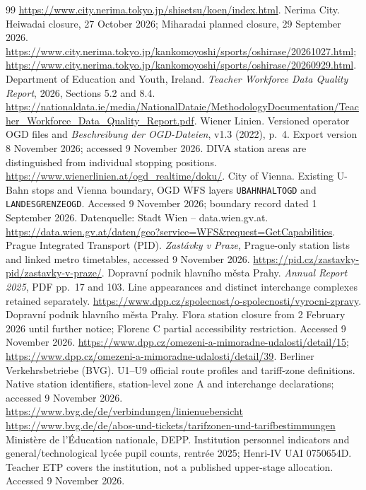 \begin{thebibliography}{99}
\url{https://www.city.nerima.tokyo.jp/shisetsu/koen/index.html}.
 Nerima City. Heiwadai closure, 27 October 2026; Miharadai planned closure, 29 September 2026.
\url{https://www.city.nerima.tokyo.jp/kankomoyoshi/sports/oshirase/20261027.html};
\url{https://www.city.nerima.tokyo.jp/kankomoyoshi/sports/oshirase/20260929.html}.
 Department of Education and Youth, Ireland. \textit{Teacher Workforce Data Quality Report}, 2026, Sections 5.2 and 8.4.
\url{https://nationaldata.ie/media/NationalDataie/MethodologyDocumentation/Teacher_Workforce_Data_Quality_Report.pdf}.
 Wiener Linien. Versioned operator OGD files and
\textit{Beschreibung der OGD-Dateien}, v1.3 (2022), p.~4. Export version
8 November 2026; accessed 9 November 2026. DIVA station areas are distinguished
from individual stopping positions.
\url{https://www.wienerlinien.at/ogd_realtime/doku/}.
 City of Vienna. Existing U-Bahn stops and Vienna boundary,
OGD WFS layers \texttt{UBAHNHALTOGD} and \texttt{LANDESGRENZEOGD}.
Accessed 9 November 2026; boundary record dated 1 September 2026.
Datenquelle: Stadt Wien -- data.wien.gv.at.
\url{https://data.wien.gv.at/daten/geo?service=WFS&request=GetCapabilities}.
 Prague Integrated Transport (PID). \textit{Zast\'avky v Praze},
Prague-only station lists and linked metro timetables, accessed 9 November 2026.
\url{https://pid.cz/zastavky-pid/zastavky-v-praze/}.
 Dopravn\'i podnik hlavn\'iho m\v{e}sta Prahy.
\textit{Annual Report 2025}, PDF pp.~17 and 103. Line appearances and
distinct interchange complexes retained separately.
\url{https://www.dpp.cz/spolecnost/o-spolecnosti/vyrocni-zpravy}.
 Dopravn\'i podnik hlavn\'iho m\v{e}sta Prahy.
Flora station closure from 2 February 2026 until further notice; Florenc C
partial accessibility restriction. Accessed 9 November 2026.
\url{https://www.dpp.cz/omezeni-a-mimoradne-udalosti/detail/15};
\url{https://www.dpp.cz/omezeni-a-mimoradne-udalosti/detail/39}.
 Berliner Verkehrsbetriebe (BVG). U1--U9 official route profiles and tariff-zone definitions. Native station identifiers, station-level zone A and interchange declarations; accessed 9 November 2026.
\url{https://www.bvg.de/de/verbindungen/linienuebersicht}
\url{https://www.bvg.de/de/abos-und-tickets/tarifzonen-und-tarifbestimmungen}
 Minist\`ere de l'\'Education nationale, DEPP. Institution personnel indicators and general/technological lyc\'ee pupil counts, rentr\'ee 2025; Henri-IV UAI 0750654D. Teacher ETP covers the institution, not a published upper-stage allocation. Accessed 9 November 2026.

\end{thebibliography}
